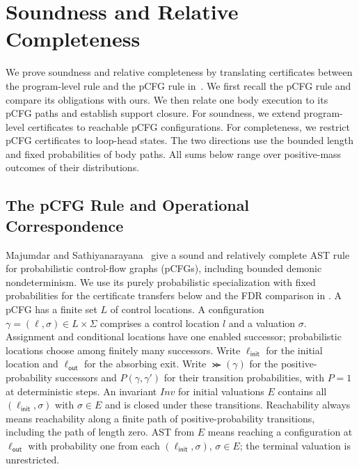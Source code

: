 \section{Soundness and Relative Completeness}
\label{sec:metatheory}

We prove soundness and relative completeness by translating certificates
between the program-level rule and the pCFG rule in~\cite{DBLP:journals/pacmpl/MajumdarS25}.
We first recall the pCFG rule and compare its obligations
with ours. We then relate one body execution to its pCFG paths and
establish support closure. For soundness, we extend program-level
certificates to reachable pCFG configurations. For completeness, we
restrict pCFG certificates to loop-head states. The two directions use
the bounded length and fixed probabilities of body paths.
All sums below range over positive-mass outcomes of their distributions.

\subsection{The pCFG Rule and Operational Correspondence}
\label{sec:pcfg-rule}

Majumdar and Sathiyanarayana~\cite{DBLP:journals/pacmpl/MajumdarS25}
give a sound and relatively complete AST rule for probabilistic
control-flow graphs (pCFGs), including bounded demonic nondeterminism.
We use its purely probabilistic specialization with fixed probabilities
for the certificate transfers below and the FDR comparison in
.
A pCFG has a finite set $L$ of control locations. A configuration
$\gamma=(\ell,\sigma)\in L\times\Sigma$ comprises a control location $l$
and a valuation $\sigma$. Assignment and conditional locations have one enabled
successor; probabilistic locations choose among finitely many successors.
Write $\ell_{\mathsf{init}}$ for the initial location and
$\ell_{\mathsf{out}}$ for the absorbing exit. Write
$\Succ(\gamma)$ for the positive-probability successors and
$P(\gamma,\gamma')$ for their transition probabilities, with $P=1$ at
deterministic steps. An invariant $\mathit{Inv}$ for initial valuations
$E$ contains all $(\ell_{\mathsf{init}},\sigma)$ with $\sigma\in E$ and
is closed under these transitions.
Reachability always means reachability along a finite path of
positive-probability transitions, including the path of length zero.
AST from $E$ means reaching a configuration at $\ell_{\mathsf{out}}$
with probability one from each $(\ell_{\mathsf{init}},\sigma)$,
$\sigma\in E$; the terminal valuation is unrestricted.


